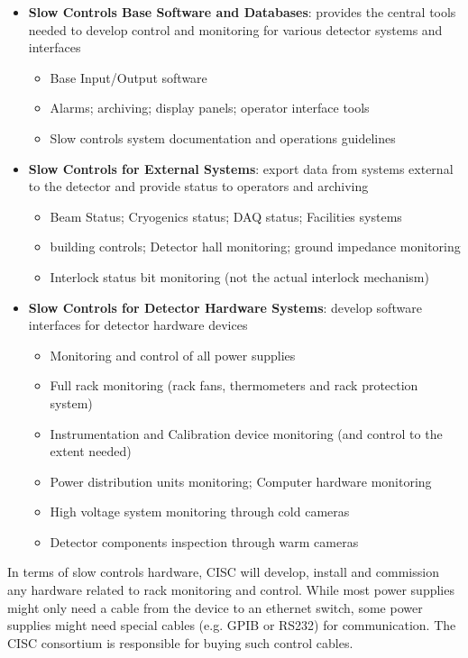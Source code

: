 \begin{itemize}
\item {\bf Slow Controls Base Software and Databases}: provides the central tools needed to develop control and monitoring for various detector systems and interfaces
  \begin{itemize}
  \item Base Input/Output software
  \item Alarms; archiving; display panels; operator interface tools
  \item Slow controls system documentation and operations guidelines
  \end{itemize}
\item {\bf Slow Controls for External Systems}: export data from systems external to the detector and provide status to operators and archiving
  \begin{itemize}
  \item Beam Status; Cryogenics status; DAQ status; Facilities systems
  \item building controls; Detector hall monitoring; ground impedance monitoring
  \item Interlock status bit monitoring (not the actual interlock mechanism)
  \end{itemize}
\item {\bf Slow Controls for Detector Hardware Systems}: develop software interfaces for detector hardware devices
  \begin{itemize}
  \item Monitoring and control of all power supplies
  \item Full rack monitoring (rack fans, thermometers and rack protection system)
  \item Instrumentation and Calibration device monitoring (and control to the extent needed)
  \item Power distribution units monitoring; Computer hardware monitoring
  \item High voltage system monitoring through cold cameras
  \item Detector components inspection through warm cameras
  \end{itemize}
\end{itemize}

In terms of slow controls hardware, CISC will develop, install and
commission any hardware related to rack monitoring and control. While
most power supplies might only need a cable from the device to an
ethernet switch, some power supplies might need special cables (e.g.
GPIB or RS232) for communication. The CISC consortium is responsible for
buying such control cables.

